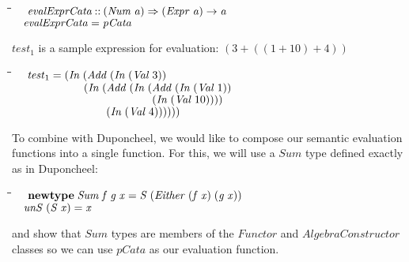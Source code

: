 \documentclass[10pt]{article}
\newlength{\lwidth}\setlength{\lwidth}{4.5cm}
\newlength{\cwidth}\setlength{\cwidth}{8mm} %
\newcommand{\Conid}[1]{\mathit{#1}}
\newcommand{\Varid}[1]{\mathit{#1}}
\begin{document}
\begin{tabbing}
\qquad\=\hspace{\lwidth}\=\hspace{\cwidth}\=\+\kill
${\hskip1.00em\relax\Varid{evalExprCata}\mathbin{::}(\Conid{Num}\;\Varid{a})\Rightarrow (\Conid{Expr}\;\Varid{a})\to \Varid{a}}$\\
${\hskip1.00em\relax\Varid{evalExprCata}\mathrel{=}\Varid{pCata}}$
\end{tabbing}
\ensuremath{\Varid{test}_1} is a sample expression for evaluation: $(3 + ((1 + 10) + 4))$

\begin{tabbing}
\qquad\=\hspace{\lwidth}\=\hspace{\cwidth}\=\+\kill
${\hskip1.00em\relax\Varid{test}_1\mathrel{=}(\Conid{In}\;(\Conid{Add}\;(\Conid{In}\;(\Conid{Val}\;\mathrm{3}))}$\\
${\hskip1.00em\relax\phantom{\Varid{test}_1\mathrel{=}(\Conid{In}\;(\mbox{}}(\Conid{In}\;(\Conid{Add}\;(\Conid{In}\;(\Conid{Add}\;(\Conid{In}\;(\Conid{Val}\;\mathrm{1}))}$\\
${\hskip1.00em\relax\phantom{\Varid{test}_1\mathrel{=}(\Conid{In}\;(\mbox{}}\phantom{(\Conid{In}\;(\Conid{Add}\;(\Conid{In}\;(\mbox{}}(\Conid{In}\;(\Conid{Val}\;\mathrm{10}))))}$\\
${\hskip1.00em\relax\phantom{\Varid{test}_1\mathrel{=}(\Conid{In}\;(\mbox{}}\phantom{(\Conid{In}\;(\mbox{}}(\Conid{In}\;(\Conid{Val}\;\mathrm{4}))))))}$
\end{tabbing}
To combine with Duponcheel, we would like to compose our semantic
evaluation functions into a single function.  For this, we will use a
\ensuremath{\Conid{Sum}} type defined exactly as in Duponcheel:

\begin{tabbing}
\qquad\=\hspace{\lwidth}\=\hspace{\cwidth}\=\+\kill
${\hskip1.00em\relax\mathbf{newtype}\;\Conid{Sum}\;\Varid{f}\;\Varid{g}\;\Varid{x}\mathrel{=}\Conid{S}\;(\Conid{Either}\;(\Varid{f}\;\Varid{x})\;(\Varid{g}\;\Varid{x}))}$\\
${}$\\
${\hskip1.00em\relax\Varid{unS}\;(\Conid{S}\;\Varid{x})\mathrel{=}\Varid{x}}$
\end{tabbing}
and show that \ensuremath{\Conid{Sum}} types are members of the \ensuremath{\Conid{Functor}} and
\ensuremath{\Conid{AlgebraConstructor}} classes so we can use \ensuremath{\Varid{pCata}} as our evaluation
function.
\end{document}
